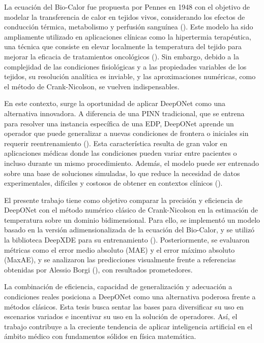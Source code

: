 \documentclass[
  spanish,
  us-letterpaper,
  DIV=11,
  numbers=noendperiod]{scrreprt}
\theoremstyle{plain}
\theoremstyle{definition}
\theoremstyle{remark}
\begin{document}
La ecuación del Bio-Calor fue propuesta por Pennes en 1948 con el
objetivo de modelar la transferencia de calor en tejidos vivos,
considerando los efectos de conducción térmica, metabolismo y perfusión
sanguínea (). Este modelo ha sido
ampliamente utilizado en aplicaciones clínicas como la hipertermia
terapéutica, una técnica que consiste en elevar localmente la
temperatura del tejido para mejorar la eficacia de tratamientos
oncológicos (). Sin embargo, debido a la complejidad de las condiciones
fisiológicas y a las propiedades variables de los tejidos, su resolución
analítica es inviable, y las aproximaciones numéricas, como el método de
Crank-Nicolson, se vuelven indispensables.

En este contexto, surge la oportunidad de aplicar DeepONet como una
alternativa innovadora. A diferencia de una PINN tradicional, que se
entrena para resolver una instancia específica de una EDP, DeepONet
aprende un operador que puede generalizar a nuevas condiciones de
frontera o iniciales sin requerir reentrenamiento
(). Esta característica
resulta de gran valor en aplicaciones médicas donde las condiciones
pueden variar entre pacientes o incluso durante un mismo procedimiento.
Además, el modelo puede ser entrenado sobre una base de soluciones
simuladas, lo que reduce la necesidad de datos experimentales, difíciles
y costosos de obtener en contextos clínicos
().

El presente trabajo tiene como objetivo comparar la precisión y
eficiencia de DeepONet con el método numérico clásico de Crank-Nicolson
en la estimación de temperatura sobre un dominio bidimensional. Para
ello, se implementó un modelo basado en la versión adimensionalizada de
la ecuación del Bio-Calor, y se utilizó la biblioteca DeepXDE para su
entrenamiento ().
Posteriormente, se evaluaron métricas como el error medio absoluto (MAE)
y el error máximo absoluto (MaxAE), y se analizaron las predicciones
visualmente frente a referencias obtenidas por Alessio Borgi
(), con resultados prometedores.

La combinación de eficiencia, capacidad de generalización y adecuación a
condiciones reales posiciona a DeepONet como una alternativa poderosa
frente a métodos clásicos. Esta tesis busca sentar las bases para
diversificar su uso en escenarios variados e incentivar su uso en la
solución de operadores. Así, el trabajo contribuye a la creciente
tendencia de aplicar inteligencia artificial en el ámbito médico con
fundamentos sólidos en física matemática.
\end{document}
